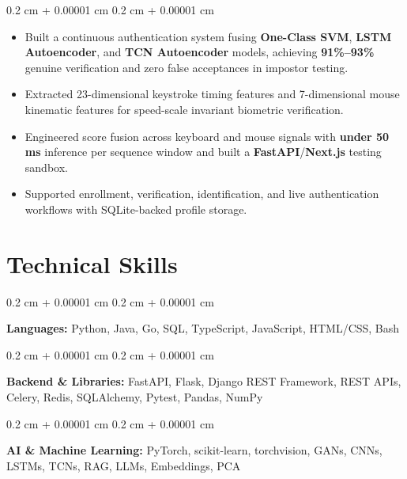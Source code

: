 \documentclass[10pt, letterpaper]{article}
\newenvironment{highlights}{
    \small
    \begin{itemize}[
        topsep=0.02 cm,
        parsep=0.015 cm,
        partopsep=0pt,
        itemsep=0.015 cm,
        leftmargin=0.4 cm + 10pt
    ]
}{
    \end{itemize}
} %
\newenvironment{onecolentry}{
    \begin{adjustwidth}{
        0.2 cm + 0.00001 cm
    }{
        0.2 cm + 0.00001 cm
    }
}{
    \end{adjustwidth}
} %
\begin{document}
        \vspace{0.02 cm}
        \begin{onecolentry}
            \begin{highlights}
                \item Built a continuous authentication system fusing \textbf{One-Class SVM}, \textbf{LSTM Autoencoder}, and \textbf{TCN Autoencoder} models, achieving \textbf{91\%--93\%} genuine verification and zero false acceptances in impostor testing.
                \item Extracted 23-dimensional keystroke timing features and 7-dimensional mouse kinematic features for speed-scale invariant biometric verification.
                \item Engineered score fusion across keyboard and mouse signals with \textbf{under 50 ms} inference per sequence window and built a \textbf{FastAPI}/\textbf{Next.js} testing sandbox.
                \item Supported enrollment, verification, identification, and live authentication workflows with SQLite-backed profile storage.
            \end{highlights}
        \end{onecolentry}

    \section{Technical Skills}

        \begin{onecolentry}
            \textbf{Languages:} Python, Java, Go, SQL, TypeScript, JavaScript, HTML/CSS, Bash
        \end{onecolentry}

        \vspace{0.02 cm}

        \begin{onecolentry}
            \textbf{Backend \& Libraries:} FastAPI, Flask, Django REST Framework, REST APIs, Celery, Redis, SQLAlchemy, Pytest, Pandas, NumPy
        \end{onecolentry}

        \vspace{0.02 cm}

        \begin{onecolentry}
            \textbf{AI \& Machine Learning:} PyTorch, scikit-learn, torchvision, GANs, CNNs, LSTMs, TCNs, RAG, LLMs, Embeddings, PCA
        \end{onecolentry}
\end{document}
